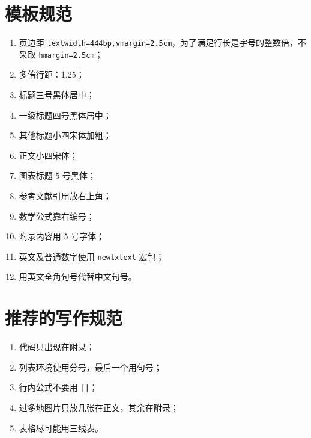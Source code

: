 \documentclass{JXUSTmodeling}
\begin{document}
\begin{abstract}
  为了让参加数学建模比赛的人专注内容，而尽可能少去关注格式，特此开发出此模板．以上是套话。

  编译环境：
  \begin{itemize}
    \item 发行版：\TeX{} Live 2020；
    \item 编译方式：\texttt{XeLaTeX}；
    \item 编码：UTF8。
  \end{itemize}

  使用水平：学习三个月及以上。

  本模板只是个说明文档，在写论文时请不要在 \texttt{example.tex} 文件上进行修改，请在 \texttt{main.tex} 上增添内容。
  
  本模板不是官方模板，开发者不对此模板作任何的担保，使用者在使用此模板时出现的任何问题、造成的损失都与开发者无关。

  模板代码托管地址：\url{https://github.com/sikouhjw/JXUSTmodeling}，有问题可以提 issue，但要遵守提问规范，参考我的博文《\href{https://sikouhjw.gitee.io/2020/03/08/2020-03-08-ask-questions/}{（我的）LaTeX 提问流程}》。
\end{abstract}

\section{模板规范}
\begin{enumerate}
  \item 页边距 \texttt{textwidth=444bp,vmargin=2.5cm}，为了满足行长是字号的整数倍，不采取 \texttt{hmargin=2.5cm}；
  \item 多倍行距：1.25；
  \item 标题三号黑体居中；
  \item 一级标题四号黑体居中；
  \item 其他标题小四宋体加粗；
  \item 正文小四宋体；
  \item 图表标题 5 号黑体；
  \item 参考文献引用放右上角；
  \item 数学公式靠右编号；
  \item 附录内容用 5 号字体；
  \item 英文及普通数字使用 \texttt{newtxtext} 宏包；
  \item 用英文全角句号代替中文句号。
\end{enumerate}

\section{推荐的写作规范}
\begin{enumerate}
  \item 代码只出现在附录；
  \item 列表环境使用分号，最后一个用句号；
  \item 行内公式不要用 \texttt{|\displaystyle|}；
  \item 过多地图片只放几张在正文，其余在附录；
  \item 表格尽可能用三线表。
\end{enumerate}
\end{document}
